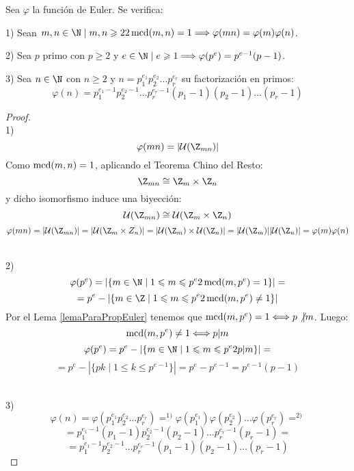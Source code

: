 \begin{prop}
    \label{propFuncionEuler}
    Sea $\varphi$ la función de Euler. Se verifica:\par
    1) Sean $m,n \in \N \mid m,n\geq 2 \y \mcd(m,n)=1 \Longrightarrow \varphi(mn)=\varphi(m)\varphi(n)$.\par
    2) Sea $p$ primo con $p\geq 2$ y $e\in \N \mid e\geq 1 \Longrightarrow \varphi(p^e) = p^{e-1}(p-1)$.\par
    3) Sea $n\in \N$ con $n\geq 2$ y $n=p_1^{e_1}p_2^{e_2}\ldots p_r^{e_r}$ su factorización en primos:
    $$\varphi(n) = p_1^{e_1-1}p_2^{e_2-1}\ldots p_r^{e_r-1}(p_1-1)(p_2-1)\ldots(p_r-1)$$
\begin{proof}
    \ \\
    1) \newline
    $$\varphi(mn) = |\cc{U}(\Z_{mn})|$$
    Como $\operatorname{mcd}(m,n)=1$, aplicando el Teorema Chino del Resto:
    $$\Z_{mn}\cong \Z_m\times \Z_n$$ y dicho isomorfismo induce una biyección:
    $$\cc{U}(\Z_{mn}) \cong \cc{U}(\Z_m \times \Z_n)$$
    $$\varphi(mn) = |\cc{U}(\Z_{mn})| = |\cc{U}(\Z_m \times Z_n)| = |\cc{U}(\Z_m) \times \cc{U}(\Z_n)| = |\cc{U}(\Z_m)||\cc{U}(\Z_n)| = \varphi(m)\varphi(n)$$

    \ \\
    
    2) \newline
    $$\varphi(p^e) = |\{m \in \N \mid 1\leq m\leq p^e \y \mcd(m,p^e) = 1\}| =$$
    $$= p^e - |\{m \in \Z \mid 1\leq m\leq p^e \y \mcd(m,p^e) \neq 1\}|$$
    Por el Lema \ref{lemaParaPropEuler} tenemos que $\operatorname{mcd}(m,p^e)=1 \Longleftrightarrow p\not|m$. Luego:\newline
    $$\operatorname{mcd}(m,p^e)\neq 1 \Longleftrightarrow p|m$$
    $$\varphi(p^e) = p^e - |\{m \in \N \mid 1 \leq m \leq p^e \y p|m\}| =$$
    $$=p^e - |\{pk \mid 1\leq k \leq p^{e-1}\}| = p^e - p^{e-1} = p^{e-1}(p-1)$$

    \ \\
    
    3) \newline
    $$\varphi(n) = \varphi(p_1^{e_1}p_2^{e_2}\ldots p_r^{e_r}) \mathop{=}^{1)}
        \varphi(p_1^{e_1})\varphi(p_2^{e_2})\ldots\varphi(p_r^{e_r}) \mathop{=}^{2)}$$
    $$=p_1^{e_1-1}(p_1-1)p_2^{e_2-1}(p_2-1)\ldots p_r^{e_r-1}(p_r-1) =$$
    $$=p_1^{e_1-1}p_2^{e_2-1}\ldots p_r^{e_r-1}(p_1-1)(p_2-1)\ldots(p_r-1)$$
\end{proof}
\end{prop}


